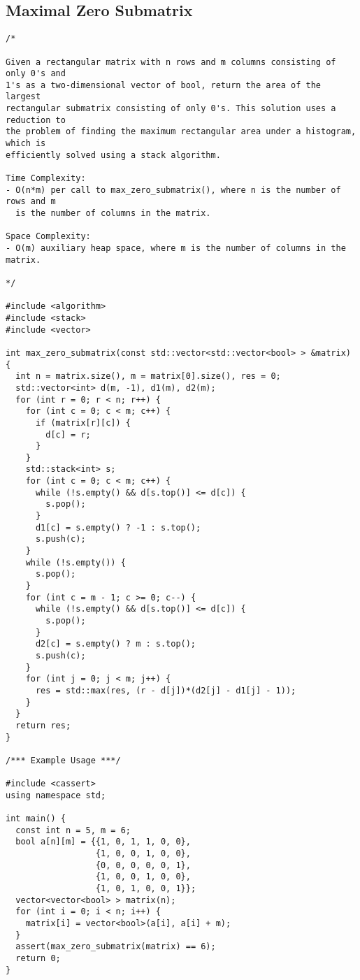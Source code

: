 \subsection{Maximal Zero Submatrix}
\begin{lstlisting}
/*

Given a rectangular matrix with n rows and m columns consisting of only 0's and
1's as a two-dimensional vector of bool, return the area of the largest
rectangular submatrix consisting of only 0's. This solution uses a reduction to
the problem of finding the maximum rectangular area under a histogram, which is
efficiently solved using a stack algorithm.

Time Complexity:
- O(n*m) per call to max_zero_submatrix(), where n is the number of rows and m
  is the number of columns in the matrix.

Space Complexity:
- O(m) auxiliary heap space, where m is the number of columns in the matrix.

*/

#include <algorithm>
#include <stack>
#include <vector>

int max_zero_submatrix(const std::vector<std::vector<bool> > &matrix) {
  int n = matrix.size(), m = matrix[0].size(), res = 0;
  std::vector<int> d(m, -1), d1(m), d2(m);
  for (int r = 0; r < n; r++) {
    for (int c = 0; c < m; c++) {
      if (matrix[r][c]) {
        d[c] = r;
      }
    }
    std::stack<int> s;
    for (int c = 0; c < m; c++) {
      while (!s.empty() && d[s.top()] <= d[c]) {
        s.pop();
      }
      d1[c] = s.empty() ? -1 : s.top();
      s.push(c);
    }
    while (!s.empty()) {
      s.pop();
    }
    for (int c = m - 1; c >= 0; c--) {
      while (!s.empty() && d[s.top()] <= d[c]) {
        s.pop();
      }
      d2[c] = s.empty() ? m : s.top();
      s.push(c);
    }
    for (int j = 0; j < m; j++) {
      res = std::max(res, (r - d[j])*(d2[j] - d1[j] - 1));
    }
  }
  return res;
}

/*** Example Usage ***/

#include <cassert>
using namespace std;

int main() {
  const int n = 5, m = 6;
  bool a[n][m] = {{1, 0, 1, 1, 0, 0},
                  {1, 0, 0, 1, 0, 0},
                  {0, 0, 0, 0, 0, 1},
                  {1, 0, 0, 1, 0, 0},
                  {1, 0, 1, 0, 0, 1}};
  vector<vector<bool> > matrix(n);
  for (int i = 0; i < n; i++) {
    matrix[i] = vector<bool>(a[i], a[i] + m);
  }
  assert(max_zero_submatrix(matrix) == 6);
  return 0;
}
\end{lstlisting}

